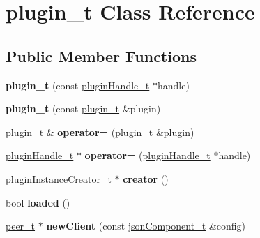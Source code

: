 \hypertarget{classplugin__t}{\section{plugin\-\_\-t \-Class \-Reference}
\label{classplugin__t}
}
\subsection*{\-Public \-Member \-Functions}
\begin{DoxyCompactItemize}
\item 
\hypertarget{classplugin__t_aeed2ab54576158f2e133292c3e3a1294}{{\bfseries plugin\-\_\-t} (const \hyperlink{classpluginHandle__t}{plugin\-Handle\-\_\-t} $\ast$handle)}\label{classplugin__t_aeed2ab54576158f2e133292c3e3a1294}

\item 
\hypertarget{classplugin__t_aaefe89ec502b1afe06a56bef5557cf0c}{{\bfseries plugin\-\_\-t} (const \hyperlink{classplugin__t}{plugin\-\_\-t} \&plugin)}\label{classplugin__t_aaefe89ec502b1afe06a56bef5557cf0c}

\item 
\hypertarget{classplugin__t_ac31db652b788e268785c43ac3592dbcf}{\hyperlink{classplugin__t}{plugin\-\_\-t} \& {\bfseries operator=} (\hyperlink{classplugin__t}{plugin\-\_\-t} \&plugin)}\label{classplugin__t_ac31db652b788e268785c43ac3592dbcf}

\item 
\hypertarget{classplugin__t_a0a4d6c969ac661185238509fb12b7d88}{\hyperlink{classpluginHandle__t}{plugin\-Handle\-\_\-t} $\ast$ {\bfseries operator=} (\hyperlink{classpluginHandle__t}{plugin\-Handle\-\_\-t} $\ast$handle)}\label{classplugin__t_a0a4d6c969ac661185238509fb12b7d88}

\item 
\hypertarget{classplugin__t_a05a3aa786eacf1717e13d1371d8dffe0}{\hyperlink{classpluginInstanceCreator__t}{plugin\-Instance\-Creator\-\_\-t} $\ast$ {\bfseries creator} ()}\label{classplugin__t_a05a3aa786eacf1717e13d1371d8dffe0}

\item 
\hypertarget{classplugin__t_a4581152e5d6a4d564c38abaabd3d206e}{bool {\bfseries loaded} ()}\label{classplugin__t_a4581152e5d6a4d564c38abaabd3d206e}

\item 
\hypertarget{classplugin__t_a11bb0759ee9dd84b8b0f6855bacc65ec}{\hyperlink{classpeer__t}{peer\-\_\-t} $\ast$ {\bfseries new\-Client} (const \hyperlink{classjsonComponent__t}{json\-Component\-\_\-t} \&config)}\label{classplugin__t_a11bb0759ee9dd84b8b0f6855bacc65ec}


\end{DoxyCompactItemize}
